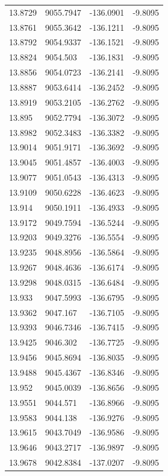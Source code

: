 \begin{table}[H]
\begin{tabular}{llll}
13.8729 & 9055.7947 & -136.0901 & -9.8095 \\
13.8761 & 9055.3642 & -136.1211 & -9.8095 \\
13.8792 & 9054.9337 & -136.1521 & -9.8095 \\
13.8824 & 9054.503 & -136.1831 & -9.8095 \\
13.8856 & 9054.0723 & -136.2141 & -9.8095 \\
13.8887 & 9053.6414 & -136.2452 & -9.8095 \\
13.8919 & 9053.2105 & -136.2762 & -9.8095 \\
13.895 & 9052.7794 & -136.3072 & -9.8095 \\
13.8982 & 9052.3483 & -136.3382 & -9.8095 \\
13.9014 & 9051.9171 & -136.3692 & -9.8095 \\
13.9045 & 9051.4857 & -136.4003 & -9.8095 \\
13.9077 & 9051.0543 & -136.4313 & -9.8095 \\
13.9109 & 9050.6228 & -136.4623 & -9.8095 \\
13.914 & 9050.1911 & -136.4933 & -9.8095 \\
13.9172 & 9049.7594 & -136.5244 & -9.8095 \\
13.9203 & 9049.3276 & -136.5554 & -9.8095 \\
13.9235 & 9048.8956 & -136.5864 & -9.8095 \\
13.9267 & 9048.4636 & -136.6174 & -9.8095 \\
13.9298 & 9048.0315 & -136.6484 & -9.8095 \\
13.933 & 9047.5993 & -136.6795 & -9.8095 \\
13.9362 & 9047.167 & -136.7105 & -9.8095 \\
13.9393 & 9046.7346 & -136.7415 & -9.8095 \\
13.9425 & 9046.302 & -136.7725 & -9.8095 \\
13.9456 & 9045.8694 & -136.8035 & -9.8095 \\
13.9488 & 9045.4367 & -136.8346 & -9.8095 \\
13.952 & 9045.0039 & -136.8656 & -9.8095 \\
13.9551 & 9044.571 & -136.8966 & -9.8095 \\
13.9583 & 9044.138 & -136.9276 & -9.8095 \\
13.9615 & 9043.7049 & -136.9586 & -9.8095 \\
13.9646 & 9043.2717 & -136.9897 & -9.8095 \\
13.9678 & 9042.8384 & -137.0207 & -9.8095 \\

\end{tabular}
\end{table}
